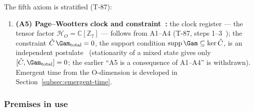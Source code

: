 The fifth axiom is stratified (T-87):

\begin{enumerate}[leftmargin=2em, start=5]
  \item \textbf{(A5) Page--Wootters clock and constraint~\cite{page1983}:} the clock
        register --- the tensor factor $\mathcal{H}_O = \mathbb{C}[\mathbb{Z}_7]$ --- follows from
        A1--A4 (T-87, steps 1--3~); the constraint $\hat{C}\,\Gam_{\mathrm{total}} = 0$,
        the support condition $\mathrm{supp}\,\Gam \subseteq \ker\hat C$, is an independent
        postulate~ (stationarity of a mixed state gives only
        $[\hat{C}, \Gam_{\mathrm{total}}] = 0$; the earlier ``A5 is a consequence of A1--A4'' is
        withdrawn). Emergent time from the O-dimension is developed in
        Section~\ref{subsec:emergent-time}.
\end{enumerate}

\subsubsection*{Premises in use}
\label{subsec:premises}


